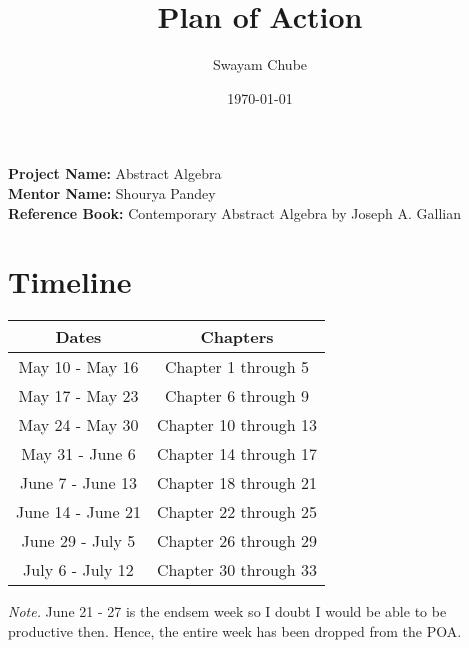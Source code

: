 \documentclass[a4paper, 12pt]{article}
\title{Plan of Action}
\author{Swayam Chube}
\date{\today}
\begin{document}
	\maketitle
	\hrulefill
	
	\textbf{Project Name:} Abstract Algebra\\
	\textbf{Mentor Name:} Shourya Pandey\\
	\textbf{Reference Book:} Contemporary Abstract Algebra by Joseph A. Gallian
	\section*{Timeline}
	\begin{center}
		\begin{tabular}{|c|c|}
			\hline
			\textbf{Dates} & \textbf{Chapters}\\
			\hline
			May 10 - May 16 & Chapter 1 through 5\\
			May 17 - May 23 & Chapter 6 through 9\\
			May 24 - May 30 & Chapter 10 through 13\\
			May 31 - June 6 & Chapter 14 through 17\\
			June 7 - June 13 & Chapter 18 through 21\\
			June 14 - June 21 & Chapter 22 through 25\\
			June 29 - July 5 & Chapter 26 through 29\\
			July 6 - July 12 & Chapter 30 through 33\\
			\hline
		\end{tabular}
	\end{center}
	\textit{Note.} June 21 - 27 is the endsem week so I doubt I would be able to be productive then. Hence, the entire week has been dropped from the POA.
\end{document}
